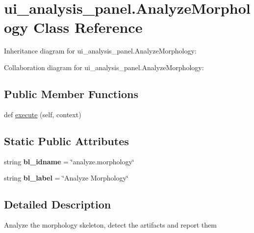 \hypertarget{classui__analysis__panel_1_1AnalyzeMorphology}{}\section{ui\+\_\+analysis\+\_\+panel.\+Analyze\+Morphology Class Reference}
\label{classui__analysis__panel_1_1AnalyzeMorphology}


Inheritance diagram for ui\+\_\+analysis\+\_\+panel.\+Analyze\+Morphology\+:


Collaboration diagram for ui\+\_\+analysis\+\_\+panel.\+Analyze\+Morphology\+:
\subsection*{Public Member Functions}
\begin{DoxyCompactItemize}
\item 
def \hyperlink{classui__analysis__panel_1_1AnalyzeMorphology_ac76733755cb92843339bfa72ff87eda8}{execute} (self, context)
\end{DoxyCompactItemize}
\subsection*{Static Public Attributes}
\begin{DoxyCompactItemize}
\item 
string {\bfseries bl\+\_\+idname} = \char`\"{}analyze.\+morphology\char`\"{}\hypertarget{classui__analysis__panel_1_1AnalyzeMorphology_ab8eb838454cce2246634e629c3c0fa70}{}\label{classui__analysis__panel_1_1AnalyzeMorphology_ab8eb838454cce2246634e629c3c0fa70}

\item 
string {\bfseries bl\+\_\+label} = \char`\"{}Analyze Morphology\char`\"{}\hypertarget{classui__analysis__panel_1_1AnalyzeMorphology_aa21c46a49f33c4d7095ee288b709d74f}{}\label{classui__analysis__panel_1_1AnalyzeMorphology_aa21c46a49f33c4d7095ee288b709d74f}

\end{DoxyCompactItemize}


\subsection{Detailed Description}
\begin{DoxyVerb}Analyze the morphology skeleton, detect the artifacts and report them\end{DoxyVerb}
 

